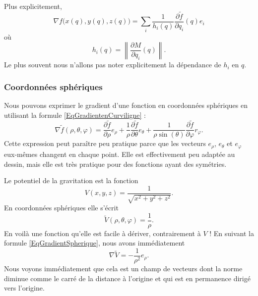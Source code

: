 Plus explicitement,
\begin{equation}        \label{EqGradientenCurviligne}
    \nabla f\big( x(q),y(q),z(q) \big)=\sum_i \frac{1}{ h_i(q) }\frac{ \partial \tilde f }{ \partial q_i }(q)e_i
\end{equation}
où
\begin{equation}
    h_i(q)=\left\| \frac{ \partial M }{ \partial q_i }(q) \right\|.
\end{equation}
Le plus souvent nous n'allons pas noter explicitement la dépendance de $h_i$ en $q$.

\subsubsection{Coordonnées sphériques}

Nous pouvons exprimer le gradient d'une fonction en coordonnées sphériques en utilisant la formule \eqref{EqGradientenCurviligne} :
\begin{equation}        \label{EqGradientSpherique}
    \nabla\tilde f(\rho,\theta,\varphi)=\frac{ \partial \tilde f }{ \partial \rho }e_{\rho}+\frac{1}{ \rho }\frac{ \partial \tilde f }{ \partial \theta }e_{\theta}+\frac{1}{ \rho\sin(\theta) }\frac{ \partial \tilde f }{ \partial \varphi }r_{\varphi}.
\end{equation}
Cette expression peut paraître peu pratique parce que les vecteurs $e_{\rho}$, $e_{\theta}$ et $e_{\varphi}$ eux-mêmes changent en chaque point. Elle est effectivement peu adaptée au dessin, mais elle est très pratique pour des fonctions ayant des symétries.

\begin{example}
    Le potentiel de la gravitation est la fonction
    \begin{equation}
        V(x,y,z)=\frac{1}{ \sqrt{x^2+y^2+z^2} }.
    \end{equation}
    En coordonnées sphériques elle s'écrit
    \begin{equation}
        \tilde V(\rho,\theta,\varphi)=\frac{1}{ \rho }.
    \end{equation}
    En voilà une fonction qu'elle est facile à dériver, contrairement à $V$ ! En suivant la formule \eqref{EqGradientSpherique}, nous avons immédiatement
    \begin{equation}
        \nabla\tilde V=-\frac{1}{ \rho^2 }e_{\rho}.
    \end{equation}
    Nous voyons immédiatement que cela est un champ de vecteurs dont la norme diminue comme le carré de la distance à l'origine et qui est en permanence dirigé vers l'origine.
\end{example}

